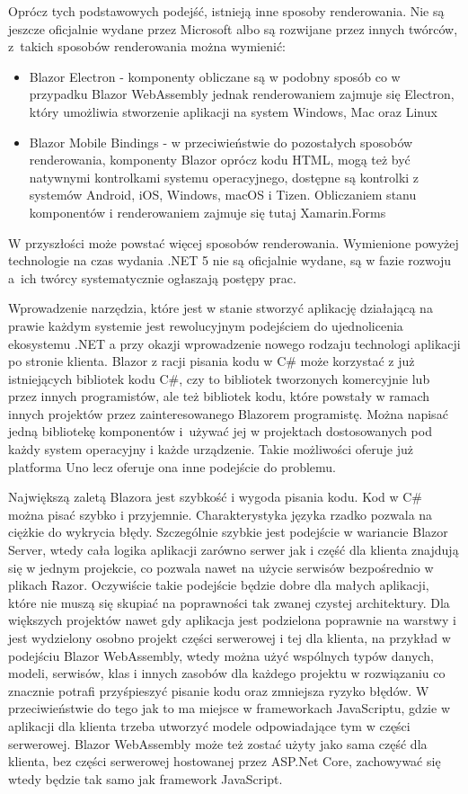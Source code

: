 \documentclass[12pt,a4paper,oneside]{book}
\begin{document}
Oprócz tych podstawowych podejść, istnieją inne sposoby renderowania. Nie są jeszcze oficjalnie wydane przez Microsoft albo są rozwijane przez innych twórców, z~takich sposobów renderowania można wymienić:

\begin{itemize}
  \item Blazor Electron - komponenty obliczane są w podobny sposób co w przypadku Blazor WebAssembly jednak renderowaniem zajmuje się Electron, który umożliwia stworzenie aplikacji na system Windows, Mac oraz Linux
  \item Blazor Mobile Bindings - w przeciwieństwie do pozostałych sposobów renderowania, komponenty Blazor oprócz kodu HTML, mogą też być natywnymi kontrolkami systemu operacyjnego, dostępne są kontrolki z systemów Android, iOS, Windows, macOS i Tizen. Obliczaniem stanu komponentów i renderowaniem zajmuje się tutaj Xamarin.Forms
\end{itemize}

W przyszłości może powstać więcej sposobów renderowania. Wymienione powyżej technologie na czas wydania .NET 5 nie są oficjalnie wydane, są w fazie rozwoju a~ich twórcy systematycznie ogłaszają postępy prac.

Wprowadzenie narzędzia, które jest w stanie stworzyć aplikację działającą na prawie każdym systemie jest rewolucyjnym podejściem do ujednolicenia ekosystemu .NET a przy okazji wprowadzenie nowego rodzaju technologi aplikacji po stronie klienta. Blazor z racji pisania kodu w C\# może korzystać z już istniejących bibliotek kodu C\#, czy to bibliotek tworzonych komercyjnie lub przez innych programistów, ale też bibliotek kodu, które powstały w ramach innych projektów przez zainteresowanego Blazorem programistę. Można napisać jedną bibliotekę komponentów i~używać jej w projektach dostosowanych pod każdy system operacyjny i każde urządzenie. Takie możliwości oferuje już platforma Uno lecz oferuje ona inne podejście do problemu.

Największą zaletą Blazora jest szybkość i wygoda pisania kodu. Kod w C\# można pisać szybko i przyjemnie. Charakterystyka języka rzadko pozwala na ciężkie do wykrycia błędy. Szczególnie szybkie jest podejście w wariancie Blazor Server, wtedy cała logika aplikacji zarówno serwer jak i część dla klienta znajdują się w jednym projekcie, co pozwala nawet na użycie serwisów bezpośrednio w plikach Razor. Oczywiście takie podejście będzie dobre dla małych aplikacji, które nie muszą się skupiać na poprawności tak zwanej czystej architektury. Dla większych projektów nawet gdy aplikacja jest podzielona poprawnie na warstwy i jest wydzielony osobno projekt części serwerowej i tej dla klienta, na przykład w podejściu Blazor WebAssembly, wtedy można użyć wspólnych typów danych, modeli, serwisów, klas i innych zasobów dla każdego projektu w rozwiązaniu co znacznie potrafi przyśpieszyć pisanie kodu oraz zmniejsza ryzyko błędów. W przeciwieństwie do tego jak to ma miejsce w frameworkach JavaScriptu, gdzie w aplikacji dla klienta trzeba utworzyć modele odpowiadające tym w części serwerowej. Blazor WebAssembly może też zostać użyty jako sama część dla klienta, bez części serwerowej hostowanej przez ASP.Net Core, zachowywać się wtedy będzie tak samo jak framework JavaScript.
\end{document}
